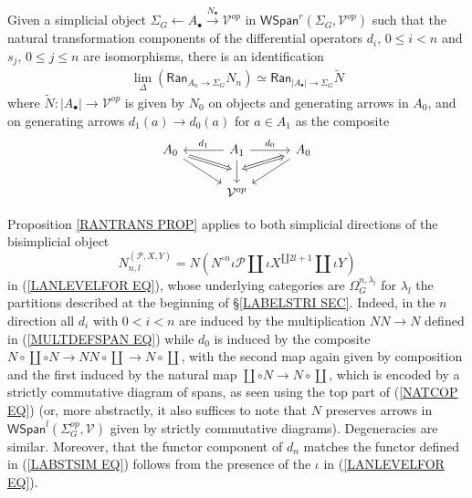 \documentclass[a4paper,10pt]{article}%
\begin{document}
\begin{proposition}\label{RANTRANS PROP}
Given a simplicial object
$\Sigma_G \leftarrow A_\bullet \xrightarrow{N_{\bullet}} \mathcal{V}^{op}$ 
in $ \mathsf{WSpan}^r(\Sigma_G,\mathcal{V}^{op})$
such that the natural transformation components of the differential operators 
$d_i$, $0\leq i < n$ and $s_j$, $0 \leq j \leq n$
are isomorphisms,
there is an identification
\begin{align*}
	\lim_{\Delta}
	\left(
	\mathsf{Ran}_{A_n \to \Sigma_G}
	N_{n}
	\right)
	\simeq 
	\mathsf{Ran}_{ |A_{\bullet}| \to \Sigma_G }
	\tilde{N}
\end{align*}
where $\tilde{N}\colon |A_{\bullet}| \to \mathcal{V}^{op}$
is given by $N_0$ on objects and generating arrows 
in $A_0$, and on generating arrows $d_1(a) \to d_0(a)$
for $a \in A_1$ as the composite
\[
\begin{tikzcd}[column sep =3em]
	|[alias=TA]|
	A_0 \ar{rd} & 
	A_1 \ar{l}[swap]{d_1} \ar{d}[name=T]{}[swap,name=B]{}
	\ar{r}{d_0} &
	|[alias=BA]|
	A_0 \ar{ld}
\\
	& \mathcal{V}^{op}
	\arrow[Rightarrow,from=TA,to=T,shorten <=0.15cm,,shorten >=0.15cm]
	\arrow[Leftrightarrow,from=BA,to=B,shorten <=0.15cm,,shorten >=0.15cm]
\end{tikzcd}
\]
\end{proposition}


Proposition \ref{RANTRANS PROP} applies to both simplicial directions of 
the bisimplicial object
\[
      N^{(\mathcal P,X,Y)}_{n,l} =
      N ( N^{\circ n} \iota \mathcal{P} \amalg
      \iota X^{\amalg 2l+1} \amalg \iota Y)
\]
in (\ref{LANLEVELFOR EQ}),
whose underlying categories are 
$\Omega_G^{n,\lambda_l}$
for $\lambda_l$ the partitions described at the beginning of
\S \ref{LABELSTRI SEC}.
Indeed, in the $n$ direction all $d_i$ with $0 < i < n$
are induced by the multiplication $NN \to N$ defined in 
(\ref{MULTDEFSPAN EQ}) while $d_0$
is induced by the composite
$N \circ \coprod \circ N \to N N \circ \coprod \to N \circ \coprod$, with the second map again given by composition
and the first induced
by the natural map 
$\coprod \circ N \to N \circ \coprod$, which is encoded by a strictly commutative diagram of spans,
as seen using the top part of (\ref{NATCOP EQ})
(or, more abstractly, 
it also suffices to note that 
$N$ preserves arrows in $\mathsf{WSpan}^l(\Sigma_G^{op},\mathcal{V})$ given by strictly commutative diagrams).
Degeneracies are similar.
Moreover, that the functor component of $d_n$
matches the functor defined in (\ref{LABSTSIM EQ})
follows from the presence of the $\iota$ in (\ref{LANLEVELFOR EQ}).
\end{document}

